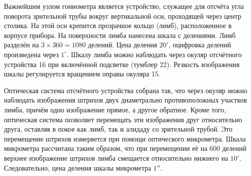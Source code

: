 \documentclass[12pt]{article}
\begin{document}
    Важнейшим узлом гониометра является устройство,
    служащее для отсчёта угла поворота зрительной трубы вокруг вертикальной оси,
    проходящей через центр столика.
    На этой оси крепится прозрачное кольцо (лимб), расположенное в корпусе прибора.
    На поверхности лимба нанесена шкала с делениями.
    Лимб разделён на $3 \times 360 = 1080$ делений. Цена деления $20'$,
    оцифровка делений произведена через $1^{\circ}$.
    Шкалу лимба можно наблюдать через окуляр отсчётного устройства 16 при включённой подсветке (тумблер 22).
    Резкость изображения шкалы регулируется вращением оправы окуляра 15.

    Оптическая система отсчётного устройства собрана так, что через окуляр
    можно наблюдать изображения штрихов двух диаметрально противоположных участков лимба,
    причём одно изображение прямое, а другое обратное.
    Кроме того, оптическая система позволяет перемещать эти изображения друг относительно друга,
    оставляя в покое как лимб, так и алидаду со зрительной трубой.
    Это перемещение штрихов измеряется при помощи оптического микрометра.
    Шкала микрометра рассчитана таким образом, что при перемещении её на 600 делений
    верхнее изображение штрихов лимба смещается относительно нижнего на $10'$.
    Следовательно, цена деления шкалы микрометра $1''$.
\end{document}
